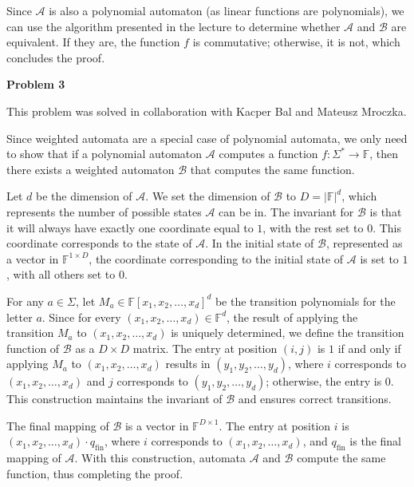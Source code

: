 \documentclass[12pt]{article}
\begin{document}
	\medskip
	
	Since \(\mathcal{A}\) is also a polynomial automaton (as linear functions
	are polynomials), we can use the algorithm presented in the lecture to
	determine whether \(\mathcal{A}\) and \(\mathcal{B}\) are equivalent. If
	they are, the function \(f\) is commutative; otherwise, it is not, which
	concludes the proof.
	
	\bigskip
	
	\textbf{Problem 3}
	
	\medskip
	
	This problem was solved in collaboration with Kacper Bal and Mateusz
	Mroczka.
	
	\medskip
	
	Since weighted automata are a special case of polynomial automata, we only
	need to show that if a polynomial automaton \(\mathcal{A}\) computes a
	function \(f : \Sigma^{\ast} \to \mathbb{F}\), then there exists a weighted
	automaton \(\mathcal{B}\) that computes the same function.
	
	\medskip
	
	Let \(d\) be the dimension of \(\mathcal{A}\). We set the dimension of
	\(\mathcal{B}\) to \(D = |\mathbb{F}|^{d}\), which represents the number of
	possible states \(\mathcal{A}\) can be in. The invariant for \(\mathcal{B}\)
	is that it will always have exactly one coordinate equal to \(1\), with the
	rest set to \(0\). This coordinate corresponds to the state of
	\(\mathcal{A}\). In the initial state of \(\mathcal{B}\), represented as a
	vector in \(\mathbb{F}^{1 \times D}\), the coordinate corresponding to the
	initial state of \(\mathcal{A}\) is set to \(1\), with all others set to
	\(0\).
	
	\medskip
	
	For any \(a \in \Sigma\), let \(M_{a} \in
	\mathbb{F}[x_{1}, x_{2}, \ldots, x_{d}]^{d}\) be the transition polynomials
	for the letter \(a\). Since for every \((x_{1}, x_{2}, \ldots, x_{d}) \in
	\mathbb{F}^{d}\), the result of applying the transition \(M_{a}\) to
	\((x_{1}, x_{2}, \ldots, x_{d})\) is uniquely determined, we define the
	transition function of \(\mathcal{B}\) as a \(D \times D\) matrix. The entry
	at position \((i, j)\) is \(1\) if and only if applying \(M_{a}\) to
	\((x_{1}, x_{2}, \ldots, x_{d})\) results in \((y_{1}, y_{2}, \ldots,
	y_{d})\), where \(i\) corresponds to \((x_{1}, x_{2}, \ldots, x_{d})\) and
	\(j\) corresponds to \((y_{1}, y_{2}, \ldots, y_{d})\); otherwise, the entry
	is \(0\). This construction maintains the invariant of \(\mathcal{B}\) and
	ensures correct transitions.
	
	\medskip
	
	The final mapping of \(\mathcal{B}\) is a vector in
	\(\mathbb{F}^{D \times 1}\). The entry at position \(i\) is \((x_{1}, x_{2},
	\ldots, x_{d}) \cdot q_{\text{fin}}\), where \(i\) corresponds to \((x_{1},
	x_{2}, \ldots, x_{d})\), and \(q_{\text{fin}}\) is the final mapping of
	\(\mathcal{A}\). With this construction, automata \(\mathcal{A}\) and
	\(\mathcal{B}\) compute the same function, thus completing the proof.
\end{document}
